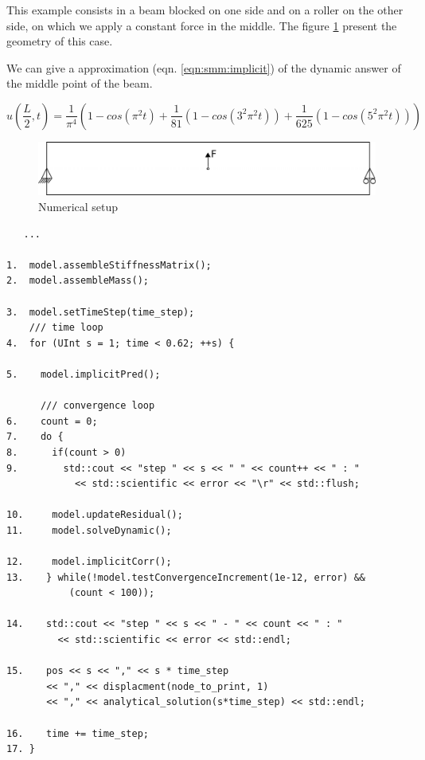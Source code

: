 \documentclass[a4paper,11pt]{book}
\begin{document}
This example consists in a beam blocked on one side and on a roller on the other
side,  on  which   we  apply  a  constant  force  in   the  middle.  The  figure
\ref{fig:smm:implicit:dynamic} present the geometry of this case.

We can give a approximation  (eqn. \ref{eqn:smm:implicit}) of the dynamic answer
of the middle point of the beam.

\begin{equation}
  u(\frac{L}{2}, t) = \frac{1}{\pi^4} (1 - cos(\pi^2 t) +
  \frac{1}{81}(1 - cos(3^2 \pi^2 t)) +
  \frac{1}{625}(1 - cos(5^2 \pi^2 t)))
\end{equation}
\label{eqn:smm:implicit}

\begin{figure}[!htb]
  \centering
  \includegraphics[scale=.6]{figures/implicit_dynamic}
  \caption{Numerical setup}
  \label{fig:smm:implicit:dynamic}
\end{figure}


\begin{verbatim}
   ...

1.  model.assembleStiffnessMatrix();
2.  model.assembleMass();

3.  model.setTimeStep(time_step);
    /// time loop
4.  for (UInt s = 1; time < 0.62; ++s) {

5.    model.implicitPred();

      /// convergence loop
6.    count = 0;
7.    do {
8.      if(count > 0)
9.        std::cout << "step " << s << " " << count++ << " : "
		    << std::scientific << error << "\r" << std::flush;

10.     model.updateResidual();
11.     model.solveDynamic();

12.     model.implicitCorr();
13.    } while(!model.testConvergenceIncrement(1e-12, error) &&
	       (count < 100));

14.    std::cout << "step " << s << " - " << count << " : "
		 << std::scientific << error << std::endl;

15.    pos << s << "," << s * time_step
	   << "," << displacment(node_to_print, 1)
	   << "," << analytical_solution(s*time_step) << std::endl;

16.    time += time_step;
17. }
\end{verbatim}
\end{document}
